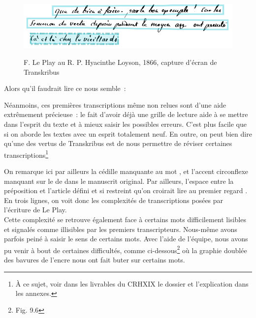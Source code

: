 \begin{figure}[ht]
    \centering
    \caption{F. Le Play au R. P. Hyacinthe Loyson, 1866, capture d'écran de Transkribus}
    \includegraphics[width=16cm]{images/ma-Transkribus.png}
    \label{ma-Transkribus}
\end{figure}
Alors qu'il faudrait lire ce nous semble~: 

Néanmoins, ces premières transcriptions même non relues sont d'une aide extrêmement précieuse~: le fait d’avoir déjà une grille de lecture aide à se mettre dans l’esprit du texte et à mieux saisir les possibles erreurs. C’est plus facile que si on aborde les textes avec un esprit totalement neuf. En outre, on peut bien dire qu'une des vertus de Transkribus est de nous permettre de réviser certaines transcriptions\footnote{À ce sujet, voir dans les livrables du CRHXIX le dossier  et l'explication dans les annexes.} 

On remarque ici par ailleurs la cédille manquante au mot , et l'accent circonflexe manquant sur le  de  dans le manuscrit original. Par ailleurs, l'espace entre la préposition  et l'article défini  et si restreint qu'on croirait lire au premier regard . En trois lignes, on voit donc les complexités de transcriptions posées par l'écriture de Le Play.\\

Cette complexité se retrouve également face à certains mots difficilement lisibles et signalés comme illisibles par les premiers transcripteurs. Nous-même avons parfois peiné à saisir le sens de certains mots. Avec l'aide de l'équipe, nous avons pu venir à bout de certaines difficultés, comme ci-dessous\footnote{Fig. 9.6} où la graphie doublée des bavures de l'encre nous ont fait buter sur certains mots.  

